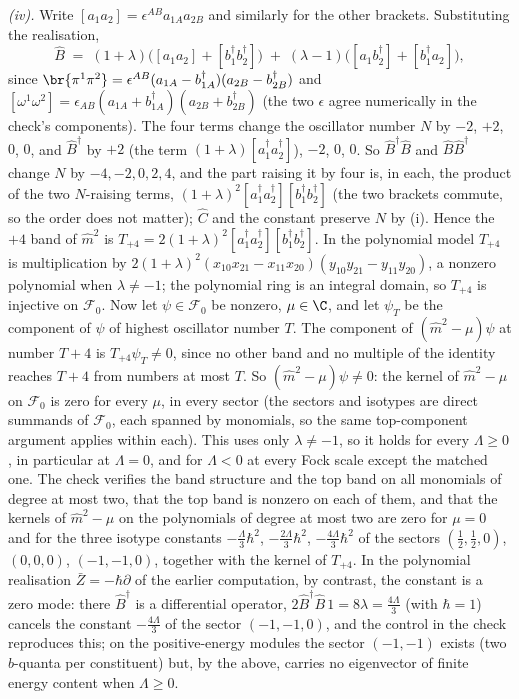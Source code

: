 \emph{(iv).} Write $[a_{1}a_{2}] = \epsilon^{AB}a_{1A}a_{2B}$ and similarly for the other brackets. Substituting the realisation,
\[
\hat{B} \;=\; (1 + \lambda)\bigl([a_{1}a_{2}] + [b^{\dagger}_{1}b^{\dagger}_{2}]\bigr) \;+\; (\lambda - 1)\bigl([a_{1}b^{\dagger}_{2}] + [b^{\dagger}_{1}a_{2}]\bigr),
\]
since $\br{\pi^{1}\pi^{2}} = \epsilon^{AB}(a_{1A} - b^{\dagger}_{1A})(a_{2B} - b^{\dagger}_{2B})$ and $[\omega^{1}\omega^{2}] = \epsilon_{AB}(a_{1A} + b^{\dagger}_{1A})(a_{2B} + b^{\dagger}_{2B})$ (the two $\epsilon$ agree numerically in the check's components). The four terms change the oscillator number $N$ by $-2$, $+2$, $0$, $0$, and $\hat{B}^{\dagger}$ by $+2$ (the term $(1+\lambda)[a^{\dagger}_{1}a^{\dagger}_{2}]$), $-2$, $0$, $0$. So $\hat{B}^{\dagger}\hat{B}$ and $\hat{B}\hat{B}^{\dagger}$ change $N$ by $-4, -2, 0, 2, 4$, and the part raising it by four is, in each, the product of the two $N$-raising terms, $(1+\lambda)^{2}[a^{\dagger}_{1}a^{\dagger}_{2}][b^{\dagger}_{1}b^{\dagger}_{2}]$ (the two brackets commute, so the order does not matter); $\hat{C}$ and the constant preserve $N$ by (i). Hence the $+4$ band of $\hat{m}^{2}$ is $T_{+4} = 2(1+\lambda)^{2}[a^{\dagger}_{1}a^{\dagger}_{2}][b^{\dagger}_{1}b^{\dagger}_{2}]$. In the polynomial model $T_{+4}$ is multiplication by $2(1+\lambda)^{2}(x_{10}x_{21} - x_{11}x_{20})(y_{10}y_{21} - y_{11}y_{20})$, a nonzero polynomial when $\lambda \ne -1$; the polynomial ring is an integral domain, so $T_{+4}$ is injective on $\mathcal{F}_{0}$. Now let $\psi \in \mathcal{F}_{0}$ be nonzero, $\mu \in \C$, and let $\psi_{T}$ be the component of $\psi$ of highest oscillator number $T$. The component of $(\hat{m}^{2} - \mu)\psi$ at number $T + 4$ is $T_{+4}\psi_{T} \ne 0$, since no other band and no multiple of the identity reaches $T + 4$ from numbers at most $T$. So $(\hat{m}^{2} - \mu)\psi \ne 0$: the kernel of $\hat{m}^{2} - \mu$ on $\mathcal{F}_{0}$ is zero for every $\mu$, in every sector (the sectors and isotypes are direct summands of $\mathcal{F}_{0}$, each spanned by monomials, so the same top-component argument applies within each). This uses only $\lambda \ne -1$, so it holds for every $\Lambda \ge 0$, in particular at $\Lambda = 0$, and for $\Lambda < 0$ at every Fock scale except the matched one. The check verifies the band structure and the top band on all monomials of degree at most two, that the top band is nonzero on each of them, and that the kernels of $\hat{m}^{2} - \mu$ on the polynomials of degree at most two are zero for $\mu = 0$ and for the three isotype constants $-\tfrac{\Lambda}{3}\hbar^{2}$, $-\tfrac{2\Lambda}{3}\hbar^{2}$, $-\tfrac{4\Lambda}{3}\hbar^{2}$ of the sectors $(\tfrac12, \tfrac12, 0)$, $(0, 0, 0)$, $(-1, -1, 0)$, together with the kernel of $T_{+4}$. In the polynomial realisation $\bar{Z} = -\hbar\partial$ of the earlier computation, by contrast, the constant is a zero mode: there $\hat{B}^{\dagger}$ is a differential operator, $2\hat{B}^{\dagger}\hat{B}\,1 = 8\lambda = \tfrac{4\Lambda}{3}$ (with $\hbar = 1$) cancels the constant $-\tfrac{4\Lambda}{3}$ of the sector $(-1, -1, 0)$, and the control in the check reproduces this; on the positive-energy modules the sector $(-1, -1)$ exists (two $b$-quanta per constituent) but, by the above, carries no eigenvector of finite energy content when $\Lambda \ge 0$.


